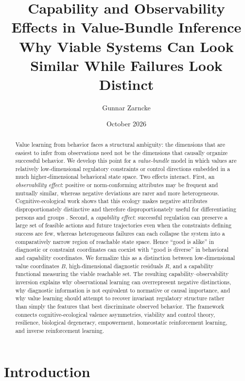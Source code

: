 \documentclass[11pt]{article}
\title{\textbf{Capability and Observability Effects in Value-Bundle Inference}\\
\large Why Viable Systems Can Look Similar While Failures Look Distinct}
\author{Gunnar Zarncke}
\date{October 2026}
\begin{document}
\maketitle

\begin{abstract}
Value learning from behavior faces a structural ambiguity: the dimensions that are easiest to infer from observations need not be the dimensions that causally organize successful behavior. We develop this point for a \emph{value-bundle} model in which values are relatively low-dimensional regulatory constraints or control directions embedded in a much higher-dimensional behavioral state space. Two effects interact. First, an \emph{observability effect}: positive or norm-conforming attributes may be frequent and mutually similar, whereas negative deviations are rarer and more heterogeneous. Cognitive-ecological work shows that this ecology makes negative attributes disproportionately distinctive and therefore disproportionately useful for differentiating persons and groups \citep{AlvesKochUnkelbach2017Common,AlvesKochUnkelbach2017Good,AlvesKochUnkelbach2018,UnkelbachKochAlves2019,UnkelbachWeitzelAlves2026}. Second, a \emph{capability effect}: successful regulation can preserve a large set of feasible actions and future trajectories even when the constraints defining success are few, whereas heterogeneous failures can each collapse the system into a comparatively narrow region of reachable state space. Hence ``good is alike'' in diagnostic or constraint coordinates can coexist with ``good is diverse'' in behavioral and capability coordinates. We formalize this as a distinction between low-dimensional value coordinates $B$, high-dimensional diagnostic residuals $R$, and a capability functional measuring the viable reachable set. The resulting capability--observability inversion explains why observational learning can overrepresent negative distinctions, why diagnostic information is not equivalent to normative or causal importance, and why value learning should attempt to recover invariant regulatory structure rather than simply the features that best discriminate observed behavior. The framework connects cognitive-ecological valence asymmetries, viability and control theory, resilience, biological degeneracy, empowerment, homeostatic reinforcement learning, and inverse reinforcement learning.
\end{abstract}

\section{Introduction}
\end{document}
